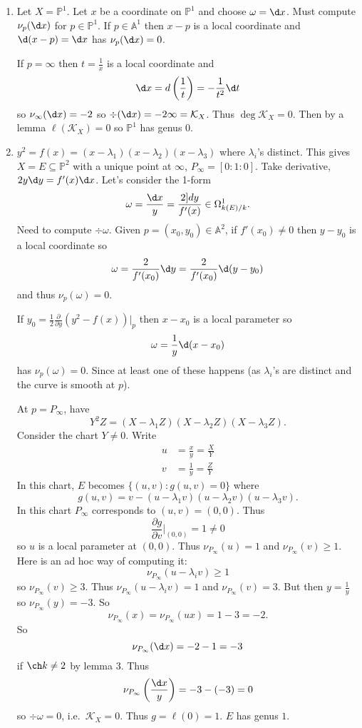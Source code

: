 \documentclass[a4paper]{article}
\renewcommand{\A}{\mathbb{A}}
\renewcommand*{\P}{\mathbb{P}}
\begin{document}
\begin{eg}\leavevmode
  \begin{enumerate}
  \item Let \(X = \P^1\). Let \(x\) be a coordinate on \(\P^1\) and choose \(\omega = \d x\). Must compute \(\nu_p(\d x)\) for \(p \in \P^1\). If \(p \in \A^1\) then \(x - p\) is a local coordinate and \(\d (x - p) = \d x\) has \(\nu_p(\d x) = 0\).

    If \(p = \infty\) then \(t = \frac{1}{x}\) is a local coordinate and
    \[
      \d x = d \left( \frac{1}{t} \right) = -\frac{1}{t^2} \d t
    \]
    so \(\nu_\infty(\d x) = -2\) so \(\div(\d x) = -2 \infty = \mathcal K_X\). Thus \(\deg \mathcal K_X = 0\). Then by a lemma \(\ell(\mathcal K_X) = 0\) so \(\P^1\) has genus \(0\).
  \item \(y^2 = f(x) = (x - \lambda_1)(x - \lambda_2)(x - \lambda_3)\) where \(\lambda_i\)'s distinct. This gives \(X = E \subseteq \P^2\) with a unique point at \(\infty\), \(P_\infty = [0:1:0]\). Take derivative, \(2 y \d y = f'(x) \d x\). Let's consider the 1-form
    \[
      \omega = \frac{\d x}{y} = \frac{2 ]d y}{f'(x)} \in \Omega^1_{k(E)/k}.
    \]
    Need to compute \(\div \omega\). Given \(p = (x_0, y_0) \in \A^2\), if \(f'(x_0) \neq 0\) then \(y - y_0\) is a local coordinate so
    \[
      \omega = \frac{2}{f'(x_0)} \d y = \frac{2}{f'(x_0)} \d (y - y_0)
    \]
    and thus \(\nu_p(\omega) = 0\).

    If \(y_0 = \frac{1}{2} \frac{\partial  }{\partial y}(y^2 - f(x))|_p\) then \(x - x_0\) is a local parameter so
    \[
      \omega = \frac{1}{y} \d (x - x_0)
    \]
    has \(\nu_p(\omega) = 0\). Since at least one of these happens (as \(\lambda_i\)'s are distinct and the curve is smooth at \(p\)).

    At \(p = P_\infty\), have
    \[
      Y^2Z = (X - \lambda_1Z)(X - \lambda_2Z)(X - \lambda_3Z).
    \]
    Consider the chart \(Y \neq 0\). Write
    \begin{align*}
      u &= \frac{x}{y} = \frac{X}{Y} \\
      v &= \frac{1}{y} = \frac{Z}{Y}
    \end{align*}
    In this chart, \(E\) becomes \(\{(u, v): g(u, v) = 0\}\) where
    \[
      g(u, v) = v - (u - \lambda_1v)(u - \lambda_2v)(u - \lambda_3v).
    \]
    In this chart \(P_\infty\) corresponds to \((u, v) = (0, 0)\). Thus
    \[
      \frac{\partial g}{\partial v}|_{(0, 0)} = 1 \neq 0
    \]
    so \(u\) is a local parameter at \((0, 0)\). Thus \(\nu_{P_\infty}(u) = 1\) and \(\nu_{P_\infty}(v) \geq 1\). Here is an ad hoc way of computing it:
    \[
      \nu_{P_\infty}(u - \lambda_i v) \geq 1
    \]
    so \(\nu_{P_\infty}(v) \geq 3\). Thus \(\nu_{P_\infty}(u - \lambda_i v) = 1\) and \(\nu_{P_\infty}(v) = 3\). But then \(y = \frac{1}{y}\) so \(\nu_{P_\infty}(y) = -3\). So
    \[
      \nu_{P_\infty}(x) = \nu_{P_\infty}(ux) = 1 - 3 = -2.
    \]
    So
    \[
      \nu_{P_\infty}(\d x) = -2 - 1 = -3
    \]
    if \(\ch k \neq 2\) by lemma 3. Thus
    \[
      \nu_{P_\infty} \left(\frac{\d x}{y}\right) = -3 - (-3) = 0
    \]
    so \(\div \omega = 0\), i.e.\ \(\mathcal K_X = 0\). Thus \(g = \ell(0) = 1\). \(E\) has genus \(1\).
  \end{enumerate}
\end{eg}
\end{document}
